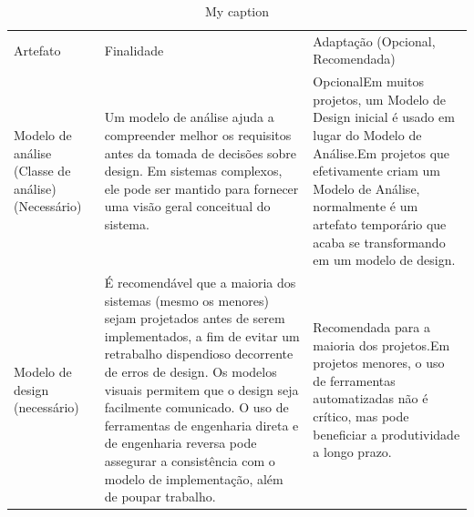 \begin{table}[]
\centering
\caption{My caption}
\label{my-label}
\begin{tabular}{lll}
Artefato                                           & Finalidade                                                                                                                                                                                                                                                                                                                                                                                                        & Adaptação (Opcional, Recomendada)                                                                                                                                                                                                                                                                                                                                                \\
Modelo de análise (Classe de análise) (Necessário) & Um modelo de análise ajuda a compreender melhor os requisitos antes da tomada de decisões sobre design. Em sistemas complexos, ele pode ser mantido para fornecer uma visão geral conceitual do sistema.                                                                                                                                                                                                          & OpcionalEm muitos projetos, um Modelo de Design inicial é usado em lugar do Modelo de Análise.Em projetos que efetivamente criam um Modelo de Análise, normalmente é um artefato temporário que acaba se transformando em um modelo de design.                                                                                                                                   \\
Modelo de design (necessário)                      & É recomendável que a maioria dos sistemas (mesmo os menores) sejam projetados antes de serem implementados, a fim de evitar um retrabalho dispendioso decorrente de erros de design. Os modelos visuais permitem que o design seja facilmente comunicado. O uso de ferramentas de engenharia direta e de engenharia reversa pode assegurar a consistência com o modelo de implementação, além de poupar trabalho. & Recomendada para a maioria dos projetos.Em projetos menores, o uso de ferramentas automatizadas não é crítico, mas pode beneficiar a produtividade a longo prazo.                                                                                                                                                                                                                \\

\end{tabular}
\end{table}
